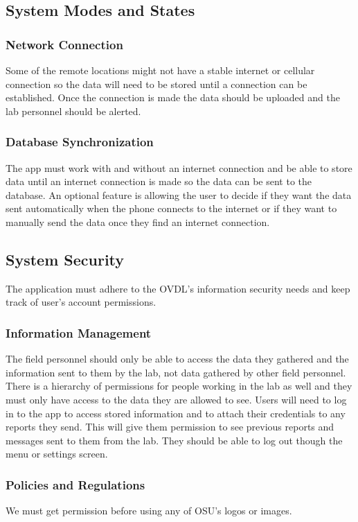 \documentclass[onecolumn, draftclsnofoot,10pt, compsoc]{IEEEtran}
\begin{document}
\subsection{System Modes and States}
\subsubsection{Network Connection}
Some of the remote locations might not have a stable internet or cellular connection so the data will need to be stored until a connection can be established. Once the connection is made the data should be uploaded and the lab personnel should be alerted. 

\subsubsection{Database Synchronization}
The app must work with and without an internet connection and be able to store data until an internet connection is made so the data can be sent to the database. 
An optional feature is allowing the user to decide if they want the data sent automatically when the phone connects to the internet or if they want to manually send the data once they find an internet connection.

\subsection{System Security}
The application must adhere to the OVDL's information security needs and keep track of user’s account permissions. 

\subsubsection{Information Management}
The field personnel should only be able to access the data they gathered and the information sent to them by the lab, not data gathered by other field personnel. 
There is a hierarchy of permissions for people working in the lab as well and they must only have access to the data they are allowed to see. 
Users will need to log in to the app to access stored information and to attach their credentials to any reports they send. 
This will give them permission to see previous reports and messages sent to them from the lab. 
They should be able to log out though the menu or settings screen.

\subsubsection{Policies and Regulations}
We must get permission before using any of OSU's logos or images. 
\end{document}
